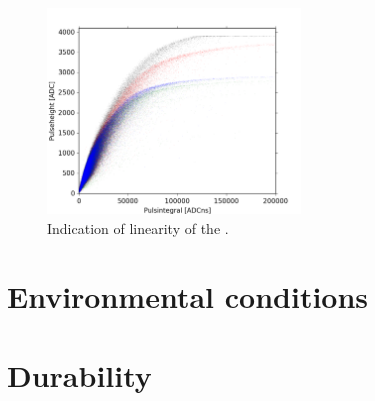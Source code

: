 \begin{figure}
    \centering
    \includegraphics[width=0.6\textwidth]{plots/response/ph_vs_pi.png}
    \caption{
             Indication of linearity of the \pmt.}
    \label{fig:pmt_ph_pi}
\end{figure}


\section{Environmental conditions}
\label{sec:detector-environmental}



\section{Durability}
\label{sec:detector-durability}

